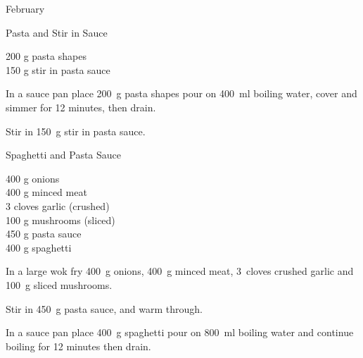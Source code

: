 \begin{menu}{February}
    \begin{recipe}{1}{Pasta and Stir in Sauce}%
		\begin{ingredients}
		200 g pasta shapes  \\
	150 g stir in pasta sauce  \\
	
		\end{ingredients}
	
    \begin{instructions}
    \item 
      In a
      sauce pan
      place
      200~g  pasta shapes
      pour on
      400~ml  boiling water,
      cover and simmer for 12 minutes, then drain.
    \item 
        Stir in
        150~g  stir in pasta sauce.
      
    \end{instructions}
    \end{recipe}%
  
    \begin{recipe}{2}{Spaghetti and Pasta Sauce}%
		\begin{ingredients}
		400 g onions  \\
	400 g minced meat  \\
	3 cloves garlic (crushed) \\
	100 g mushrooms (sliced) \\
	450 g pasta sauce  \\
	400 g spaghetti  \\
	
		\end{ingredients}
	
	
    \begin{instructions}
    \item 
        In a large wok fry
        400~g  onions,
        400~g  minced meat,
        3~cloves crushed garlic
        and
        100~g sliced mushrooms.
      \item 
        Stir in
        450~g  pasta sauce,
        and warm through.
      \item 
      In a
      sauce pan
      place
      400~g  spaghetti
      pour on
      800~ml  boiling water and continue boiling for 12 minutes then drain.
    
    \end{instructions}
    \end{recipe}%
  

\end{menu}
